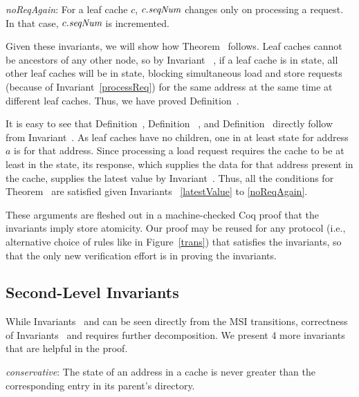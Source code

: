 \begin{inv}
\textit{noReqAgain}: For a leaf cache $c$, $c.\textit{seqNum}$ changes only on processing a request. In
that case, $c.\textit{seqNum}$ is incremented.
\label{noReqAgain}
\end{inv}

Given these invariants, we will show how Theorem~
follows.
Leaf caches cannot be ancestors of any other node, so by Invariant~
, if a leaf cache is in \Mo{} state, all other
leaf caches will be in \In{} state, blocking simultaneous
load and store requests (because of Invariant~\ref{processReq}) for the same
address at the same time at different leaf caches. Thus, we have proved
Definition~.

It is easy to see that Definition~, Definition~
, and Definition~ directly follow
from Invariant~.  As leaf caches have no children, one in
at least \Sh{} state for address $a$ is \clean{} for that address. Since
processing a load request requires the cache to be at least in the \Sh{} state,
its response, which supplies the data for that address present in the cache,
supplies the latest value by Invariant~. Thus, all the
conditions for Theorem~ are satisfied given Invariants~
\ref{latestValue} to \ref{noReqAgain}.

These arguments are fleshed out in a machine-checked Coq proof that the invariants
imply store atomicity.  Our proof may be reused for any protocol (i.e., alternative
choice of rules like in Figure~\ref{trans}) that satisfies the invariants,
so that the only new verification effort is in proving the invariants.


\subsection{Second-Level Invariants}
\label{secondLevel}

While Invariants~ and  can be seen
directly from the MSI transitions, correctness of Invariants~
 and  requires further
decomposition. We present 4 more invariants that are helpful in the proof.

\begin{inv}
\textit{conservative}: The state of an address in a cache is never greater than
the corresponding entry in its parent's directory.
\label{conservative}
\end{inv}

